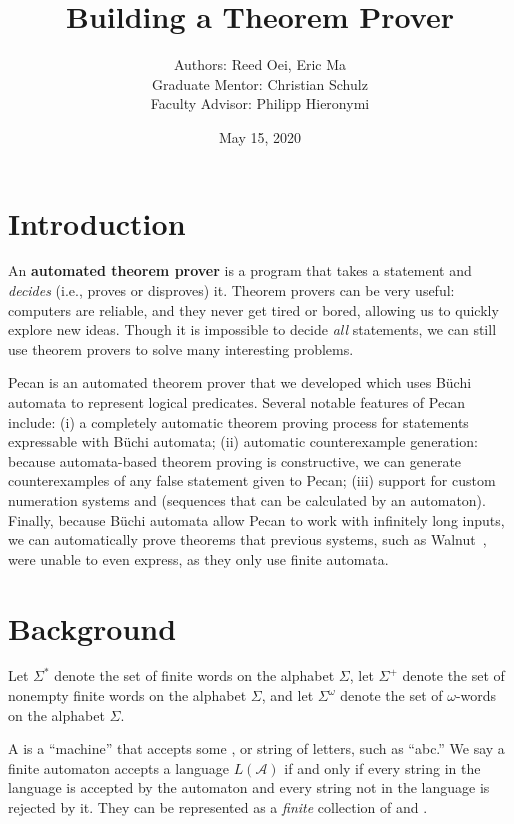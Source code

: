 \documentclass[a4paper,usenames,dvipsnames]{article}
\title{Building a Theorem Prover}
\author{
Authors: Reed Oei, Eric Ma \\
Graduate Mentor: Christian Schulz \\
Faculty Advisor: Philipp Hieronymi \\
}
\date{May 15, 2020}
\begin{document}
\maketitle

\section{Introduction}
An \textbf{automated theorem prover} is a program that takes a statement and \emph{decides} (i.e., proves or disproves) it. 
Theorem provers can be very useful: computers are reliable, and they never get tired or bored, allowing us to quickly explore new ideas.
Though it is impossible to decide \emph{all} statements, we can still use theorem provers to solve many interesting problems. 

Pecan is an automated theorem prover that we developed which uses B\"uchi automata to represent logical predicates.
Several notable features of Pecan include: (i) a completely automatic theorem proving process for statements expressable with B\"uchi automata; (ii) automatic counterexample generation: because automata-based theorem proving is constructive, we can generate counterexamples of any false statement given to Pecan; (iii) support for custom numeration systems and  (sequences that can be calculated by an automaton).
Finally, because B\"uchi automata allow Pecan to work with infinitely long inputs, we can automatically prove theorems that previous systems, such as Walnut~\cite{walnut}, were unable to even express, as they only use finite automata.

\section{Background}

Let $\Sigma^*$ denote the set of finite words on the alphabet $\Sigma$, let $\Sigma^+$ denote the set of nonempty finite words on the alphabet $\Sigma$, and let $\Sigma^\omega$ denote the set of $\omega$-words on the alphabet $\Sigma$.

A  is a ``machine'' that accepts some , or string of letters, such as ``abc.''
We say a finite automaton accepts a language $L(\mathcal{A})$ if and only if every string in the language is accepted by the automaton and every string not in the language is rejected by it.
They can be represented as a \emph{finite} collection of  and .
\end{document}
